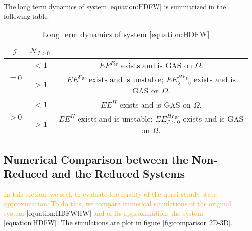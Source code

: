 \documentclass{article}
\newcommand{\cI}{\mathcal{I}}
\newcommand{\vdeux}[1]{\textcolor{orange}{#1}}
\theoremstyle{definition}
\theoremstyle{remark}
\begin{document}
The long term dynamics of system \eqref{equation:HDFW} is summarized in the following table:

\begin{table}[!ht]
\centering
\def\arraystretch{2}
\begin{tabular}{c|c|c}
$\cI$  & $\mathcal{N}_{I\geq 0}$ & \\
\hline
\multirow{2}{*}{$=0$}& $ < 1$ &$EE^{F_W}$ exists and is GAS on $\Omega$.  \\
\cline{2-3}
 &  \multirow{1}{*}{$> 1$}  &$EE^{F_W}$ exists and is unstable; $EE^{HF_W}_{\cI=0}$ exists and is GAS on $\Omega$.\\
\hline
\hline
\multirow{2}{*}{$>0$} & $< 1$ &$EE^{H}$ exists and is GAS on $\Omega$. \\
\cline{2-3}
 & \multirow{1}{*}{$> 1$}  &$EE^{H}$ exists and is unstable; $EE^{HF_W}_{\cI>0}$ exists and is GAS on $\Omega$. \\
\end{tabular}
\caption{\centering Long term dynamics of system \eqref{equation:HDFW}}
\label{table: reduced long term dynamics, I = 0}
\end{table}

\subsection{Numerical Comparison between the Non-Reduced and the Reduced Systems}
\vdeux{In this section, we seek to evaluate the quality of the quasi-steady state approximation. To do this, we compare numerical simulations of the original system \eqref{equation:HDFWHW} and of its approximation, the system \eqref{equation:HDFW}.} The simulations are plot in figure \ref{fig:comparison 2D-3D}.
\end{document}
